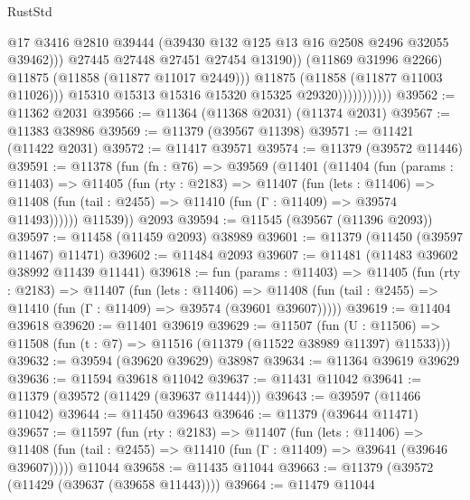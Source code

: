 \begin{lexlean}{RustStd}
\begin{coremodule}
                                      @17
                                      @3416
                                      @2810
                                      @39444
                                      (@39430 @132 @125 @13 @16 @2508 @2496 @32055 @39462)))
                                  @27445
                                  @27448
                                  @27451
                                  @27454
                                  @13190))
                              (@11869 @31996 @2266)
                              @11875
                              (@11858 (@11877 @11017 @2449)))
                            @11875
                            (@11858 (@11877 @11003 @11026)))
                          @15310
                          @15313
                          @15316
                          @15320
                          @15325
                          @29320)))))))))))
@39562 := @11362 @2031
@39566 := @11364 (@11368 @2031) (@11374 @2031)
@39567 := @11383 @38986
@39569 := @11379 (@39567 @11398)
@39571 := @11421 (@11422 @2031)
@39572 := @11417 @39571
@39574 := @11379 (@39572 @11446)
@39591 := @11378
    (fun (fn : @76) =>
    @39569
      (@11401
        (@11404
          (fun (params : @11403) =>
          @11405
            (fun (rty : @2183) =>
            @11407
              (fun (lets : @11406) =>
              @11408 (fun (tail : @2455) => @11410 (fun (Γ : @11409) => @39574 @11493))))))
        @11539))
    @2093
@39594 := @11545 (@39567 (@11396 @2093))
@39597 := @11458 (@11459 @2093) @38989
@39601 := @11379 (@11450 (@39597 @11467) @11471)
@39602 := @11484 @2093
@39607 := @11481 (@11483 @39602 @38992 @11439 @11441)
@39618 := fun (params : @11403) =>
  @11405
    (fun (rty : @2183) =>
    @11407
      (fun (lets : @11406) =>
      @11408 (fun (tail : @2455) => @11410 (fun (Γ : @11409) => @39574 (@39601 @39607)))))
@39619 := @11404 @39618
@39620 := @11401 @39619
@39629 := @11507
    (fun (U : @11506) => @11508 (fun (t : @7) => @11516 (@11379 (@11522 @38989 @11397) @11533)))
@39632 := @39594 (@39620 @39629) @38987
@39634 := @11364 @39619 @39629
@39636 := @11594 @39618 @11042
@39637 := @11431 @11042
@39641 := @11379 (@39572 (@11429 (@39637 @11444)))
@39643 := @39597 (@11466 @11042)
@39644 := @11450 @39643
@39646 := @11379 (@39644 @11471)
@39657 := @11597
    (fun (rty : @2183) =>
    @11407
      (fun (lets : @11406) =>
      @11408 (fun (tail : @2455) => @11410 (fun (Γ : @11409) => @39641 (@39646 @39607)))))
    @11044
@39658 := @11435 @11044
@39663 := @11379 (@39572 (@11429 (@39637 (@39658 @11443))))
@39664 := @11479 @11044

\end{coremodule}
\end{lexlean}

